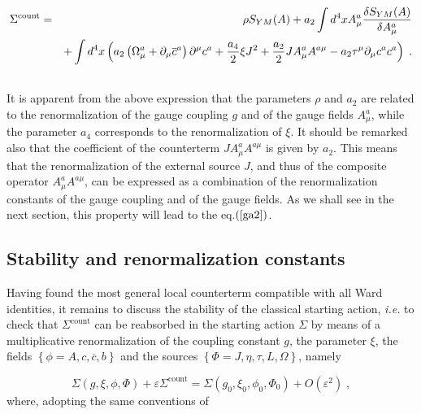 \documentclass[a4paper,12pt]{article}
\begin{document}
\begin{eqnarray}
\Sigma ^{\mathrm{count}} &=&\rho S_{YM}(A)+a_{2}\int d^{4}xA_{\mu }^{a}\frac{%
\delta S_{YM}(A)}{\delta A_{\mu }^{a}}  \nonumber \\
&&+\int d^{4}x\left( a_{2}\left( \Omega _{\mu }^{a}+\partial _{\mu }%
\overline{c}^{a}\right) \partial ^{\mu }c^{a}+\frac{a_{4}}{2}\xi J^{2}+\frac{%
a_{2}}{2}JA_{\mu }^{a}A^{a\mu }-a_{2}\tau ^{\mu }\partial _{\mu
}c^{a}c^{a}\right) \;.  \nonumber \\
&&  \label{ctf}
\end{eqnarray}
It is apparent from the above expression that the parameters $\rho $ and $%
a_{2}$ are related to the renormalization of the gauge coupling $g$ and of
the gauge fields $A_{\mu }^{a}$, while the parameter $a_{4}$ corresponds to
the renormalization of $\xi $. It should be remarked also that the
coefficient of the counterterm $JA_{\mu }^{a}A^{a\mu }$ is given by $a_{2}$.
This means that the renormalization of the external source $J$, and thus of
the composite operator $A_{\mu }^{a}A^{a\mu }$, can be expressed as a
combination of the renormalization constants of the gauge coupling and of
the gauge fields. As we shall see in the next section, this property will
lead to the eq.$\left( \ref{ga2}\right) $.

\subsection{Stability and renormalization constants}

Having found the most general local counterterm compatible with all Ward
identities, it remains to discuss the stability \cite{book} of the classical
starting action, \textit{i.e.} to check that $\Sigma ^{\mathrm{count}}$ can
be reabsorbed in the starting action $\Sigma $ by means of a multiplicative
renormalization of the coupling constant $g$, the parameter $\xi $, the
fields $\left\{ \phi =A,c,\overline{c},b\right\} $ and the sources $\left\{
\Phi =J,\eta ,\tau ,L,\Omega \right\} $, namely

\begin{equation}
\Sigma (g,\xi ,\phi ,\Phi )+\varepsilon \Sigma ^{\mathrm{count}}=\Sigma
(g_{0},\xi _{0},\phi _{0},\Phi _{0})+O(\varepsilon ^{2})\;,  \label{stab}
\end{equation}
where, adopting the same conventions of \cite{gr}
\end{document}
